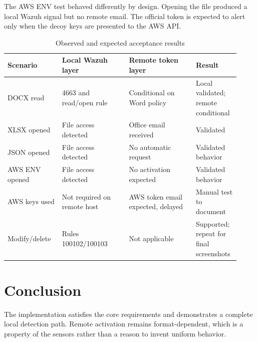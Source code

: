 The AWS ENV test behaved differently by design. Opening the file produced a
local Wazuh signal but no remote email. The official token is expected to alert
only when the decoy keys are presented to the AWS API.

\begin{table}[H]
\centering
\caption{Observed and expected acceptance results}
\label{tab:acceptance-results}
\small
\begin{tabular}{p{0.22\linewidth}p{0.27\linewidth}p{0.27\linewidth}p{0.16\linewidth}}
\toprule
Scenario & Local Wazuh layer & Remote token layer & Result \\
\midrule
DOCX read & 4663 and read/open rule & Conditional on Word policy & Local validated; remote conditional \\
XLSX opened & File access detected & Office email received & Validated \\
JSON opened & File access detected & No automatic request & Validated behavior \\
AWS ENV opened & File access detected & No activation expected & Validated behavior \\
AWS keys used & Not required on remote host & AWS token email expected, delayed & Manual test to document \\
Modify/delete & Rules 100102/100103 & Not applicable & Supported; repeat for final screenshots \\
\bottomrule
\end{tabular}
\end{table}

\section{Conclusion}

The implementation satisfies the core requirements and demonstrates a complete
local detection path. Remote activation remains format-dependent, which is a
property of the sensors rather than a reason to invent uniform behavior.
